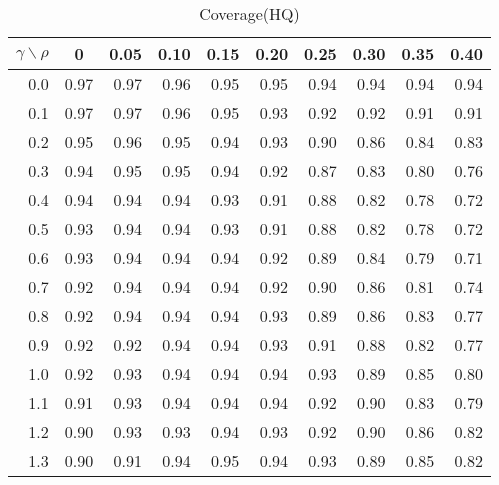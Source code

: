 \documentclass[12pt]{article}
\begin{document}
%
\begin{table}[!tbp]
\caption{Coverage(HQ)}
 \begin{center}
 \begin{tabular}{r|rrrrrrrrr}\hline\hline
\multicolumn{1}{c|}{$\gamma\backslash\rho$}&\multicolumn{1}{c}{0}&\multicolumn{1}{c}{0.05}&\multicolumn{1}{c}{0.10}&\multicolumn{1}{c}{0.15}&\multicolumn{1}{c}{0.20}&\multicolumn{1}{c}{0.25}&\multicolumn{1}{c}{0.30}&\multicolumn{1}{c}{0.35}&\multicolumn{1}{c}{0.40}\tabularnewline
\hline

0.0&0.97&0.97&0.96&0.95&0.95&0.94&0.94&0.94&0.94\tabularnewline
0.1&0.97&0.97&0.96&0.95&0.93&0.92&0.92&0.91&0.91\tabularnewline
0.2&0.95&0.96&0.95&0.94&0.93&0.90&0.86&0.84&0.83\tabularnewline
0.3&0.94&0.95&0.95&0.94&0.92&0.87&0.83&0.80&0.76\tabularnewline
0.4&0.94&0.94&0.94&0.93&0.91&0.88&0.82&0.78&0.72\tabularnewline
0.5&0.93&0.94&0.94&0.93&0.91&0.88&0.82&0.78&0.72\tabularnewline
0.6&0.93&0.94&0.94&0.94&0.92&0.89&0.84&0.79&0.71\tabularnewline
0.7&0.92&0.94&0.94&0.94&0.92&0.90&0.86&0.81&0.74\tabularnewline
0.8&0.92&0.94&0.94&0.94&0.93&0.89&0.86&0.83&0.77\tabularnewline
0.9&0.92&0.92&0.94&0.94&0.93&0.91&0.88&0.82&0.77\tabularnewline
1.0&0.92&0.93&0.94&0.94&0.94&0.93&0.89&0.85&0.80\tabularnewline
1.1&0.91&0.93&0.94&0.94&0.94&0.92&0.90&0.83&0.79\tabularnewline
1.2&0.90&0.93&0.93&0.94&0.93&0.92&0.90&0.86&0.82\tabularnewline
1.3&0.90&0.91&0.94&0.95&0.94&0.93&0.89&0.85&0.82\tabularnewline
\hline
\end{tabular}

\end{center}

\end{table}
\end{document}
